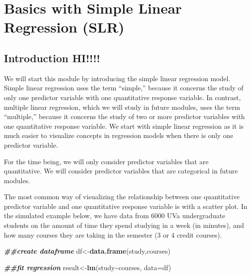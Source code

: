 \documentclass[
]{book}
\newenvironment{Shaded}{\begin{snugshade}}{\end{snugshade}}
\newcommand{\AttributeTok}[1]{\textcolor[rgb]{0.13,0.29,0.53}{#1}}
\newcommand{\DocumentationTok}[1]{\textcolor[rgb]{0.56,0.35,0.01}{\textbf{\textit{#1}}}}
\newcommand{\FunctionTok}[1]{\textcolor[rgb]{0.13,0.29,0.53}{\textbf{#1}}}
\newcommand{\NormalTok}[1]{#1}
\newcommand{\OtherTok}[1]{\textcolor[rgb]{0.56,0.35,0.01}{#1}}
\newcommand{\SpecialCharTok}[1]{\textcolor[rgb]{0.81,0.36,0.00}{\textbf{#1}}}
\newcommand{\StringTok}[1]{\textcolor[rgb]{0.31,0.60,0.02}{#1}}
\begin{document}
\hypertarget{slr}{%
\chapter{Basics with Simple Linear Regression (SLR)}\label{slr}}

\hypertarget{introduction-hi}{%
\section{Introduction HI!!!!}\label{introduction-hi}}

We will start this module by introducing the simple linear regression model. Simple linear regression uses the term ``simple,'' because it concerns the study of only one predictor variable with one quantitative response variable. In contrast, multiple linear regression, which we will study in future modules, uses the term ``multiple,'' because it concerns the study of two or more predictor variables with one quantitative response variable. We start with simple linear regression as it is much easier to visualize concepts in regression models when there is only one predictor variable.

For the time being, we will only consider predictor variables that are quantitative. We will consider predictor variables that are categorical in future modules.

The most common way of visualizing the relationship between one quantitative predictor variable and one quantitative response variable is with a scatter plot. In the simulated example below, we have data from 6000 UVa undergraduate students on the amount of time they spend studying in a week (in minutes), and how many courses they are taking in the semester (3 or 4 credit courses).

\begin{Shaded}
\begin{Highlighting}[]
\DocumentationTok{\#\#create dataframe}
\NormalTok{df}\OtherTok{\textless{}{-}}\FunctionTok{data.frame}\NormalTok{(study,courses)}

\DocumentationTok{\#\#fit regression}
\NormalTok{result}\OtherTok{\textless{}{-}}\FunctionTok{lm}\NormalTok{(study}\SpecialCharTok{\textasciitilde{}}\NormalTok{courses, }\AttributeTok{data=}\NormalTok{df)}
\end{Highlighting}
\end{Shaded}

\begin{Shaded}
\end{Shaded}
\end{document}
